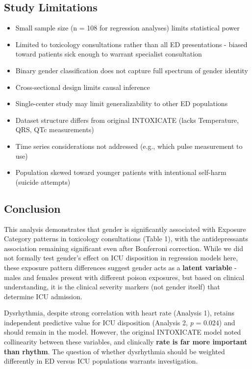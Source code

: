 \documentclass[
]{article}
\providecommand{\tightlist}{%
  \setlength{\itemsep}{0pt}\setlength{\parskip}{0pt}}
\begin{document}
\subsection{Study Limitations}\label{study-limitations}

\begin{itemize}
\tightlist
\item
  Small sample size (n = 108 for regression analyses) limits statistical power
\item
  Limited to toxicology consultations rather than all ED presentations - biased toward patients sick enough to warrant specialist consultation
\item
  Binary gender classification does not capture full spectrum of gender identity
\item
  Cross-sectional design limits causal inference
\item
  Single-center study may limit generalizability to other ED populations
\item
  Dataset structure differs from original INTOXICATE (lacks Temperature, QRS, QTc measurements)
\item
  Time series considerations not addressed (e.g., which pulse measurement to use)
\item
  Population skewed toward younger patients with intentional self-harm (suicide attempts)
\end{itemize}

\subsection{Conclusion}\label{conclusion}

This analysis demonstrates that gender is significantly associated with Exposure Category patterns in toxicology consultations (Table 1), with the antidepressants association remaining significant even after Bonferroni correction. While we did not formally test gender's effect on ICU disposition in regression models here, these exposure pattern differences suggest gender acts as a \textbf{latent variable} - males and females present with different poison exposures, but based on clinical understanding, it is the clinical severity markers (not gender itself) that determine ICU admission.

Dysrhythmia, despite strong correlation with heart rate (Analysis 1), retains independent predictive value for ICU disposition (Analysis 2, \emph{p} = 0.024) and should remain in the model. However, the original INTOXICATE model noted collinearity between these variables, and clinically \textbf{rate is far more important than rhythm}. The question of whether dysrhythmia should be weighted differently in ED versus ICU populations warrants investigation.
\end{document}
